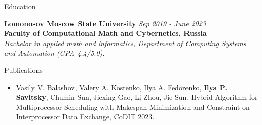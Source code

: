 \documentclass{resume} %
\begin{document}
\begin{rSection}{Education}

{\bf Lomonosov Moscow State University } \hfill {\em Sep 2019 - June 2023} \\
{\bf Faculty of Computational Math and Cybernetics, Russia}
\\{ \textit { Bachelor in applied math and informatics, Department of Computing Systems and Automation (GPA 4.4/5.0). }}

\end{rSection}

\begin{rSection}{Publications}
\begin{itemize}
    \item Vasily V. Balashov, Valery A. Kostenko, Ilya A. Fedorenko, \textbf{Ilya P. Savitsky}, Chumin Sun, Jiexing Gao, Li Zhou, Jie Sun. Hybrid Algorithm for Multiprocessor Scheduling with Makespan Minimization and Constraint on Interprocessor Data Exchange, CoDIT 2023.
\end{itemize}
\end{rSection}
\end{document}
